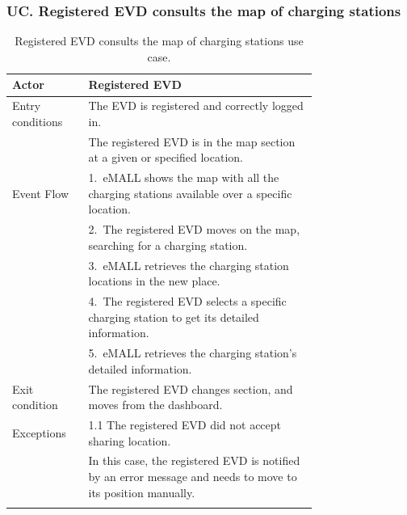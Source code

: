 \subsubsection*{UC\cuc . Registered EVD consults the map of charging stations}
\begin{center}
    \begin{longtable}{lp{0.75\linewidth}}
        \hline
        Actor            & Registered EVD                                                                                               \\
        \hline
        Entry conditions & The EVD is registered and correctly logged in.                                                               \\
        & The registered EVD is in the map section at a given or specified location.                                   \\
        \hline
        Event Flow       & 1.\ eMALL shows the map with all the charging stations available over a specific location.                   \\
        & 2.\ The registered EVD moves on the map, searching for a charging station.                                   \\
        & 3.\ eMALL retrieves the charging station locations in the new place.                                         \\
        & 4.\ The registered EVD selects a specific charging station to get its detailed information.                  \\
        & 5.\ eMALL retrieves the charging station's detailed information.                                             \\
        \hline
        Exit condition   & The registered EVD changes section, and moves from the dashboard.                                            \\
        \hline
        Exceptions       & 1.1 The registered EVD did not accept sharing location.                                                      \\
        & In this case, the registered EVD is notified by an error message and needs to move to its position manually. \\
        \hline
        \caption{Registered EVD consults the map of charging stations use case.}
        \label{tab: EVD_map_charging_stations_use_case}
    \end{longtable}


\end{center}
